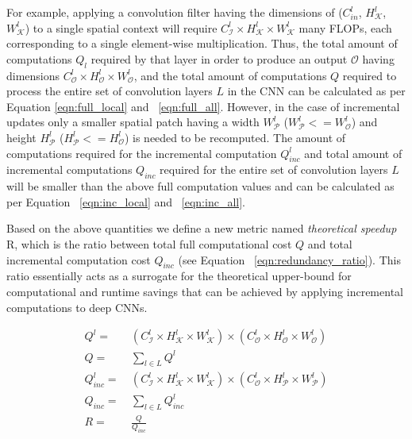 For example, applying a convolution filter having the dimensions of ($C^l_{in}$, $H^l_{\mathcal{K}}$, $W^l_{\mathcal{K}}$) to a single spatial context will require $C^l_{\mathcal{I}} \times H^l_{\mathcal{K}} \times W^l_{\mathcal{K}}$ many FLOPs, each corresponding to a single element-wise multiplication.
Thus, the total amount of computations $Q_l$ required by that layer in order to produce an output $\mathcal{O}$ having dimensions $C^l_{\mathcal{O}} \times H^l_{\mathcal{O}} \times W^l_{\mathcal{O}}$, and the total amount of computations $Q$ required to process the entire set of convolution layers $L$ in the CNN can be calculated as per Equation \ref{eqn:full_local} and ~\ref{eqn:full_all}.
However, in the case of incremental updates only a smaller spatial patch having a width $W^l_\mathcal{P}$ ($W^l_\mathcal{P}<=W^l_{\mathcal{O}}$) and height $H^l_\mathcal{P}$ ($H^l_\mathcal{P}<=H^l_{\mathcal{O}}$) is needed to be recomputed.
The amount of computations required for the incremental computation $Q^l_{inc}$ and total amount of incremental computations $Q_{inc}$ required for the entire set of convolution layers $L$ will be smaller than the above full computation values and can be calculated as per Equation ~\ref{eqn:inc_local} and ~\ref{eqn:inc_all}.

Based on the above quantities we define a new metric named \textit{theoretical speedup} R, which is the ratio between total full computational cost $Q$ and total incremental computation cost $Q_{inc}$ (see Equation ~\ref{eqn:redundancy_ratio}).
This ratio essentially acts as a surrogate for the theoretical upper-bound for computational and runtime savings that can be achieved by applying incremental computations to deep CNNs.

\begin{align}
\label{eqn:full_local}
Q^l =&~ (C^l_{\mathcal{I}} \times H^l_{\mathcal{K}} \times W^l_{\mathcal{K}}) \times (C^l_{\mathcal{O}} \times H^l_{\mathcal{O}} \times W^l_{\mathcal{O}})\\
\label{eqn:full_all}
Q =&~ \sum_{l \in L} Q^l\\
\label{eqn:inc_local}
Q_{inc}^l =&~ (C^l_{\mathcal{I}} \times H^l_{\mathcal{K}} \times W^l_{\mathcal{K}}) \times (C^l_{\mathcal{O}} \times H^l_{\mathcal{P}} \times W^l_{\mathcal{P}})\\
\label{eqn:inc_all}
Q_{inc} =&~ \sum_{l \in L} Q^l_{inc}\\
\label{eqn:redundancy_ratio}
R =&~ \frac{Q}{Q_{inc}}
\end{align}


